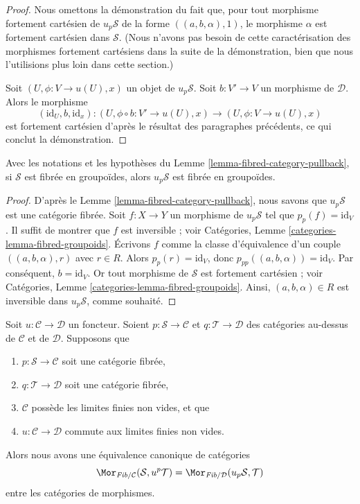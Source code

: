\begin{proof}
\medskip\noindent
Nous omettons la démonstration du fait que, pour tout morphisme fortement cartésien
de $u_p\mathcal{S}$ de la forme $((a, b, \alpha), 1)$, le morphisme
$\alpha$ est fortement cartésien dans $\mathcal{S}$.
(Nous n'avons pas besoin de cette caractérisation des morphismes fortement cartésiens
dans la suite de la démonstration, bien que nous l'utilisions plus loin dans cette section.)

\medskip\noindent
Soit $(U, \phi : V \to u(U), x)$ un objet de $u_p\mathcal{S}$.
Soit $b : V' \to V$ un morphisme de $\mathcal{D}$. Alors le morphisme
$$
(\text{id}_U, b, \text{id}_x) :
(U, \phi \circ b : V' \to u(U), x)
\longrightarrow
(U, \phi : V \to u(U), x)
$$
est fortement cartésien d'après le résultat des paragraphes précédents, ce qui conclut la démonstration.
\end{proof}

\begin{lemma}
\label{lemma-fibred-groupoids-category-pullback}
Avec les notations et les hypothèses du
Lemme \ref{lemma-fibred-category-pullback},
si $\mathcal{S}$ est fibrée en groupoïdes, alors $u_p\mathcal{S}$ est fibrée
en groupoïdes.
\end{lemma}

\begin{proof}
D'après le
Lemme \ref{lemma-fibred-category-pullback},
nous savons que $u_p\mathcal{S}$ est une catégorie fibrée.
Soit $f : X \to Y$ un morphisme de $u_p\mathcal{S}$ tel que
$p_p(f) = \text{id}_V$. Il suffit de montrer que $f$ est inversible ; voir
Catégories, Lemme \ref{categories-lemma-fibred-groupoids}.
Écrivons $f$ comme la classe d'équivalence
d'un couple $((a, b, \alpha), r)$ avec $r \in R$. Alors $p_p(r) = \text{id}_V$,
donc $p_{pp}((a, b, \alpha)) = \text{id}_V$. Par conséquent, $b = \text{id}_V$.
Or tout morphisme de $\mathcal{S}$ est fortement cartésien ; voir
Catégories, Lemme \ref{categories-lemma-fibred-groupoids}.
Ainsi, $(a, b, \alpha) \in R$ est inversible
dans $u_p\mathcal{S}$, comme souhaité.
\end{proof}

\begin{lemma}
\label{lemma-adjointness-pullback-pushforward}
Soit $u : \mathcal{C} \to \mathcal{D}$ un foncteur.
Soient $p : \mathcal{S} \to \mathcal{C}$ et $q : \mathcal{T} \to \mathcal{D}$
des catégories au-dessus de $\mathcal{C}$ et de $\mathcal{D}$. Supposons que
\begin{enumerate}
\item $p : \mathcal{S} \to \mathcal{C}$ soit une catégorie fibrée,
\item $q : \mathcal{T} \to \mathcal{D}$ soit une catégorie fibrée,
\item $\mathcal{C}$ possède les limites finies non vides, et que
\item $u : \mathcal{C} \to \mathcal{D}$ commute aux limites finies non vides.
\end{enumerate}
Alors nous avons une équivalence canonique de catégories
$$
\Mor_{\textit{Fib}/\mathcal{C}}(\mathcal{S}, u^p\mathcal{T})
=
\Mor_{\textit{Fib}/\mathcal{D}}(u_p\mathcal{S}, \mathcal{T})
$$
entre les catégories de morphismes.
\end{lemma}

